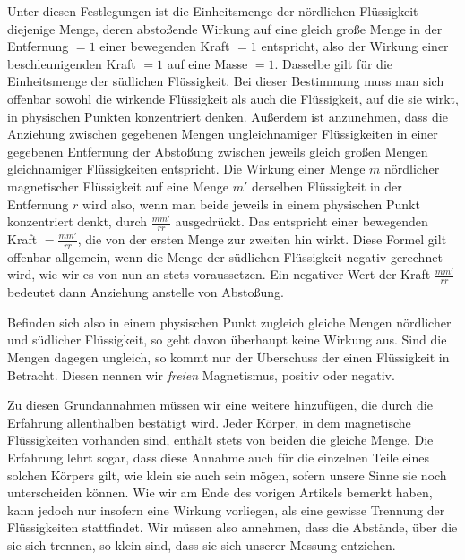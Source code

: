 Unter diesen Festlegungen ist die Einheitsmenge der nördlichen Flüssigkeit diejenige Menge, deren abstoßende Wirkung auf eine gleich große Menge in der Entfernung $=1$ einer bewegenden Kraft $=1$ entspricht, also der Wirkung einer beschleunigenden Kraft $=1$ auf eine Masse $=1$. Dasselbe gilt für die Einheitsmenge der südlichen Flüssigkeit. Bei dieser Bestimmung muss man sich offenbar sowohl die wirkende Flüssigkeit als auch die Flüssigkeit, auf die sie wirkt, in physischen Punkten konzentriert denken. Außerdem ist anzunehmen, dass die Anziehung zwischen gegebenen Mengen ungleichnamiger Flüssigkeiten in einer gegebenen Entfernung der Abstoßung zwischen jeweils gleich großen Mengen gleichnamiger Flüssigkeiten entspricht. Die Wirkung einer Menge $m$ nördlicher magnetischer Flüssigkeit auf eine Menge $m'$ derselben Flüssigkeit in der Entfernung $r$ wird also, wenn man beide jeweils in einem physischen Punkt konzentriert denkt, durch $\frac{mm'}{rr}$ ausgedrückt. Das entspricht einer bewegenden Kraft $=\frac{mm'}{rr}$, die von der ersten Menge zur zweiten hin wirkt. Diese Formel gilt offenbar allgemein, wenn die Menge der südlichen Flüssigkeit negativ gerechnet wird, wie wir es von nun an stets voraussetzen. Ein negativer Wert der Kraft $\frac{mm'}{rr}$ bedeutet dann Anziehung anstelle von Abstoßung.

Befinden sich also in einem physischen Punkt zugleich gleiche Mengen nördlicher und südlicher Flüssigkeit, so geht davon überhaupt keine Wirkung aus. Sind die Mengen dagegen ungleich, so kommt nur der Überschuss der einen Flüssigkeit in Betracht. Diesen nennen wir \textit{freien} Magnetismus, positiv oder negativ.

Zu diesen Grundannahmen müssen wir eine weitere hinzufügen, die durch die Erfahrung allenthalben bestätigt wird. Jeder Körper, in dem magnetische Flüssigkeiten vorhanden sind, enthält stets von beiden die gleiche Menge. Die Erfahrung lehrt sogar, dass diese Annahme auch für die einzelnen Teile eines solchen Körpers gilt, wie klein sie auch sein mögen, sofern unsere Sinne sie noch unterscheiden können. Wie wir am Ende des vorigen Artikels bemerkt haben, kann jedoch nur insofern eine Wirkung vorliegen, als eine gewisse Trennung der Flüssigkeiten stattfindet. Wir müssen also annehmen, dass die Abstände, über die sie sich trennen, so klein sind, dass sie sich unserer Messung entziehen.


